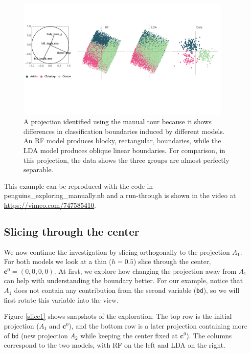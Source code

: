 \documentclass[]{interact}
\theoremstyle{plain}%
\theoremstyle{definition}
\theoremstyle{remark}
\begin{document}
\begin{figure}[ht]
\centerline{\includegraphics[width=0.95\textwidth]{figures/proj1.pdf}}
\caption{A projection identified using the manual tour because it shows differences in classification boundaries induced by different models. An RF model produces blocky, rectangular, boundaries, while the LDA model produces oblique linear boundaries. For comparison, in this projection, the data shows the three groups are almost perfectly separable.}
\label{proj1}
\end{figure}

This example can be reproduced with the code in
penguins\_exploring\_manually.nb and a run-through is shown in the video
at \url{https://vimeo.com/747585410}.

\hypertarget{slicing-through-the-center}{%
\subsection{Slicing through the
center}\label{slicing-through-the-center}}

We now continue the investigation by slicing orthogonally to the
projection \(A_1\). For both models we look at a thin (\(h=0.5\)) slice
through the center, \(\mathbf{c}^0 = (0,0,0,0)\). At first, we explore
how changing the projection away from \(A_1\) can help with
understanding the boundary better. For our example, notice that \(A_1\)
does not contain any contribution from the second variable
(\texttt{bd}), so we will first rotate this variable into the view.

Figure \ref{slice1} shows snapshots of the exploration. The top row is
the initial projection (\(A_1\) and \(\mathbf{c}^0\)), and the bottom
row is a later projection containing more of \texttt{bd} (new projection
\(A_2\) while keeping the center fixed at \(\mathbf{c}^0\)). The columns
correspond to the two models, with RF on the left and LDA on the right.
\end{document}
